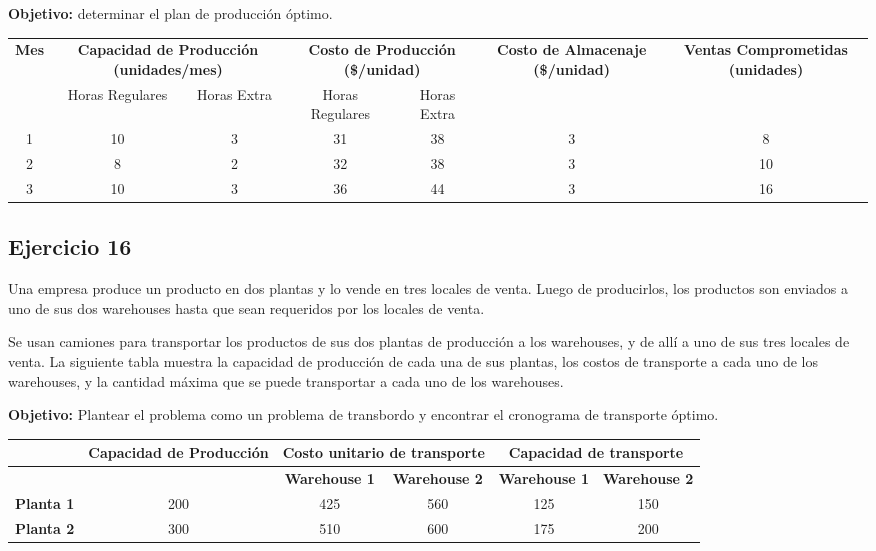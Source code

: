 \documentclass[12pt]{article}
\begin{document}
\textbf{Objetivo:} determinar el plan de producción óptimo.

\begin{center}
\begin{tabular}{c|cc|cc|c|c}
\toprule
\textbf{Mes} & \multicolumn{2}{c|}{\textbf{Capacidad de Producción (unidades/mes)}} & \multicolumn{2}{c|}{\textbf{Costo de Producción (\$/unidad)}} & \textbf{Costo de Almacenaje (\$/unidad)} & \textbf{Ventas Comprometidas (unidades)} \\
\cmidrule(lr){2-3} \cmidrule(lr){4-5}
& Horas Regulares & Horas Extra & Horas Regulares & Horas Extra & & \\
\midrule
1 & 10 & 3 & 31 & 38 & 3 & 8 \\
2 & 8 & 2 & 32 & 38 & 3 & 10 \\
3 & 10 & 3 & 36 & 44 & 3 & 16 \\
\bottomrule
\end{tabular}
\end{center}

\subsection{Ejercicio 16}

Una empresa produce un producto en dos plantas y lo vende en tres locales de venta. Luego de producirlos, los productos son enviados a uno de sus dos warehouses hasta que sean requeridos por los locales de venta.

Se usan camiones para transportar los productos de sus dos plantas de producción a los warehouses, y de allí a uno de sus tres locales de venta. La siguiente tabla muestra la capacidad de producción de cada una de sus plantas, los costos de transporte a cada uno de los warehouses, y la cantidad máxima que se puede transportar a cada uno de los warehouses.

\textbf{Objetivo:} Plantear el problema como un problema de transbordo y encontrar el cronograma de transporte óptimo.

\begin{center}
\begin{tabular}{c|c|cc|cc}
\hline
& \textbf{Capacidad de Producción} & \multicolumn{2}{c|}{\textbf{Costo unitario de transporte}} & \multicolumn{2}{c}{\textbf{Capacidad de transporte}} \\
\hline
& & \textbf{Warehouse 1} & \textbf{Warehouse 2} & \textbf{Warehouse 1} & \textbf{Warehouse 2} \\
\hline
\textbf{Planta 1} & 200 & 425 & 560 & 125 & 150 \\
\textbf{Planta 2} & 300 & 510 & 600 & 175 & 200 \\
\hline
\end{tabular}
\end{center}
\end{document}
